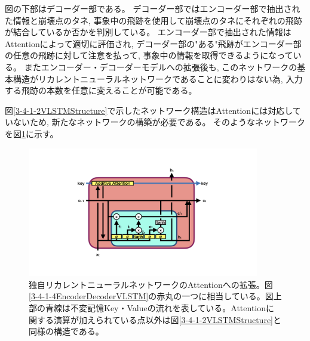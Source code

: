 図の下部はデコーダー部である。
デコーダー部ではエンコーダー部で抽出された情報と崩壊点のタネ, 事象中の飛跡を使用して崩壊点のタネにそれぞれの飛跡が結合しているか否かを判別している。
エンコーダー部で抽出された情報はAttentionによって適切に評価され, デコーダー部の"ある"飛跡がエンコーダー部の任意の飛跡に対して注意を払って, 事象中の情報を取得できるようになっている。
またエンコーダー・デコーダーモデルへの拡張後も, このネットワークの基本構造がリカレントニューラルネットワークであることに変わりはない為, 入力する飛跡の本数を任意に変えることが可能である。

図\ref{3-4-1-2VLSTMStructure}で示したネットワーク構造はAttentionには対応していないため, 新たなネットワークの構築が必要である。
そのようなネットワークを図\ref{3-4-1-5AttentionVLSTM}に示す。

\begin{figure}[htbp]
 \centering
 \includegraphics[trim = 100 0 100 0, width=0.9\textwidth, clip]{Figure/3Networks/3-4-1-5AttentionVLSTM.png}
 \caption[独自リカレントニューラルネットワークのAttentionへの拡張]{独自リカレントニューラルネットワークのAttentionへの拡張。図\ref{3-4-1-4EncoderDecoderVLSTM}の赤丸の一つに相当している。図上部の青線は不変記憶Key・Valueの流れを表している。Attentionに関する演算が加えられている点以外は図\ref{3-4-1-2VLSTMStructure}と同様の構造である。}
 \label{3-4-1-5AttentionVLSTM}
\end{figure}

